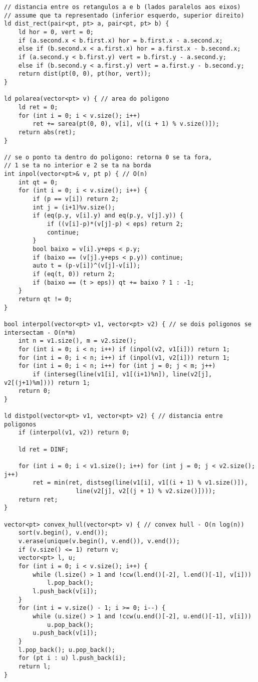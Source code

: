 \documentclass[11pt, a4paper, twoside]{article}
\begin{document}
\begin{verbatim}
// distancia entre os retangulos a e b (lados paralelos aos eixos)
// assume que ta representado (inferior esquerdo, superior direito)
ld dist_rect(pair<pt, pt> a, pair<pt, pt> b) {
	ld hor = 0, vert = 0;
	if (a.second.x < b.first.x) hor = b.first.x - a.second.x;
	else if (b.second.x < a.first.x) hor = a.first.x - b.second.x;
	if (a.second.y < b.first.y) vert = b.first.y - a.second.y;
	else if (b.second.y < a.first.y) vert = a.first.y - b.second.y;
	return dist(pt(0, 0), pt(hor, vert));
}

ld polarea(vector<pt> v) { // area do poligono
	ld ret = 0;
	for (int i = 0; i < v.size(); i++)
		ret += sarea(pt(0, 0), v[i], v[(i + 1) % v.size()]);
	return abs(ret);
}

// se o ponto ta dentro do poligono: retorna 0 se ta fora,
// 1 se ta no interior e 2 se ta na borda
int inpol(vector<pt>& v, pt p) { // O(n)
	int qt = 0;
	for (int i = 0; i < v.size(); i++) {
		if (p == v[i]) return 2;
		int j = (i+1)%v.size();
		if (eq(p.y, v[i].y) and eq(p.y, v[j].y)) {
			if ((v[i]-p)*(v[j]-p) < eps) return 2;
			continue;
		}
		bool baixo = v[i].y+eps < p.y;
		if (baixo == (v[j].y+eps < p.y)) continue;
		auto t = (p-v[i])^(v[j]-v[i]);
		if (eq(t, 0)) return 2;
		if (baixo == (t > eps)) qt += baixo ? 1 : -1;
	}
	return qt != 0;
}

bool interpol(vector<pt> v1, vector<pt> v2) { // se dois poligonos se intersectam - O(n*m)
	int n = v1.size(), m = v2.size();
	for (int i = 0; i < n; i++) if (inpol(v2, v1[i])) return 1;
	for (int i = 0; i < n; i++) if (inpol(v1, v2[i])) return 1;
	for (int i = 0; i < n; i++) for (int j = 0; j < m; j++)
		if (interseg(line(v1[i], v1[(i+1)%n]), line(v2[j], v2[(j+1)%m]))) return 1;
	return 0;
}

ld distpol(vector<pt> v1, vector<pt> v2) { // distancia entre poligonos
	if (interpol(v1, v2)) return 0;
    
	ld ret = DINF;
    
	for (int i = 0; i < v1.size(); i++) for (int j = 0; j < v2.size(); j++)
		ret = min(ret, distseg(line(v1[i], v1[(i + 1) % v1.size()]),
					line(v2[j], v2[(j + 1) % v2.size()])));
	return ret;
}

vector<pt> convex_hull(vector<pt> v) { // convex hull - O(n log(n))
	sort(v.begin(), v.end());
	v.erase(unique(v.begin(), v.end()), v.end());
	if (v.size() <= 1) return v;
	vector<pt> l, u;
	for (int i = 0; i < v.size(); i++) {
		while (l.size() > 1 and !ccw(l.end()[-2], l.end()[-1], v[i]))
			l.pop_back();
		l.push_back(v[i]);
	}
	for (int i = v.size() - 1; i >= 0; i--) {
		while (u.size() > 1 and !ccw(u.end()[-2], u.end()[-1], v[i]))
			u.pop_back();
		u.push_back(v[i]);
	}
	l.pop_back(); u.pop_back();
	for (pt i : u) l.push_back(i);
	return l;
}


\end{verbatim}
\end{document}
